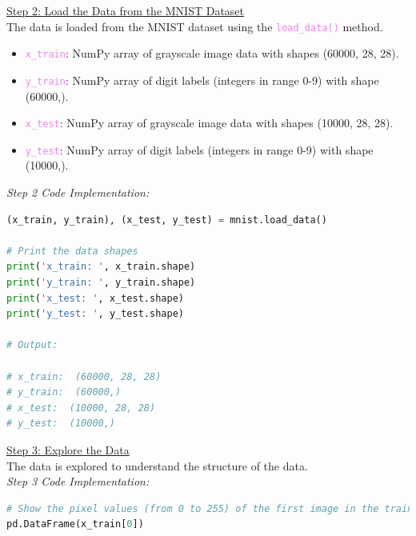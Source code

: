\documentclass{book}
\begin{document}
\uline{Step 2: Load the Data from the MNIST Dataset}\\
\vspace{1mm}
The data is loaded from the MNIST dataset using the \textcolor{violet}{\texttt{load\_data()}} method.
\begin{itemize}
    \item \textcolor{violet}{\texttt{x\_train}}: NumPy array of grayscale image data with shapes (60000, 28, 28).
    \item \textcolor{violet}{\texttt{y\_train}}: NumPy array of digit labels (integers in range 0-9) with shape (60000,).
    \item \textcolor{violet}{\texttt{x\_test}}: NumPy array of grayscale image data with shapes (10000, 28, 28).
    \item \textcolor{violet}{\texttt{y\_test}}: NumPy array of digit labels (integers in range 0-9) with shape (10000,).
\end{itemize}
\vspace{3mm}
\textit{\large{Step 2 Code Implementation:}}
\begin{lstlisting}[language=Python, basicstyle=\ttfamily\small, keywordstyle=\color{blue}, commentstyle=\color{forestgreen}, stringstyle=\color{red}, showstringspaces=false]
(x_train, y_train), (x_test, y_test) = mnist.load_data()

# Print the data shapes
print('x_train: ', x_train.shape)
print('y_train: ', y_train.shape)
print('x_test: ', x_test.shape)
print('y_test: ', y_test.shape)

# Output:

# x_train:  (60000, 28, 28)
# y_train:  (60000,)
# x_test:  (10000, 28, 28)
# y_test:  (10000,)
\end{lstlisting}
\newpage
\uline{Step 3: Explore the Data}\\
\vspace{1mm}
The data is explored to understand the structure of the data.\\
\vspace{3mm}
\textit{\large{Step 3 Code Implementation:}}
\begin{lstlisting}[language=Python, basicstyle=\ttfamily\small, keywordstyle=\color{blue}, commentstyle=\color{forestgreen}, stringstyle=\color{red}, showstringspaces=false]
# Show the pixel values (from 0 to 255) of the first image in the training set
pd.DataFrame(x_train[0])
\end{lstlisting}
\end{document}
